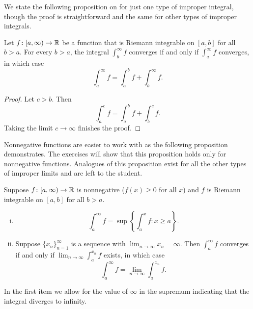 We state the following proposition on  for just one type
of improper integral, though the proof is straightforward
and the same for other types of improper integrals.

\begin{prop} \label{impropriemann:tail}
Let $f \colon [a,\infty) \to {\mathbb{R}}$ be a function
that is Riemann integrable on $[a,b]$ for all $b > a$.
For every $b > a$, the integral
$\int_b^\infty f$ converges if and only if $\int_a^\infty f$
converges, in which case
\begin{equation*}
\int_a^\infty f
=
\int_a^b f +
\int_b^\infty f .
\end{equation*}
\end{prop}

\begin{proof}
Let $c > b$.  Then
\begin{equation*}
\int_a^c f
=
\int_a^b f +
\int_b^c f .
\end{equation*}
Taking the limit $c \to \infty$ finishes the proof.
\end{proof}

Nonnegative functions are easier to work with
as the following proposition demonstrates.
The exercises will show that this proposition
holds only for nonnegative functions.
Analogues of this proposition
exist for all the other types of improper limits and are left to the
student.

\begin{prop} \label{impropriemann:possimp}
Suppose $f \colon [a,\infty) \to {\mathbb{R}}$ is nonnegative ($f(x)
\geq 0$ for all $x$) and
$f$ is Riemann integrable on $[a,b]$ for all $b > a$.
\begin{enumerate}[(i)]
\item 
\begin{equation*}
\int_a^\infty f = \sup \left\{ \int_a^x f : x \geq a \right\} .
\end{equation*}
\item
Suppose $\{ x_n \}_{n=1}^\infty$
is a sequence with $\lim_{n\to\infty} x_n = \infty$.  Then
$\int_a^\infty f$ converges if and only if $\lim_{n\to\infty} \int_a^{x_n} f$ exists, in
which case
\begin{equation*}
\int_a^\infty f = \lim_{n\to\infty} \int_a^{x_n} f .
\end{equation*}
\end{enumerate}
\end{prop}

In the first item we allow for the value of $\infty$ in the
supremum indicating that the integral diverges to infinity.

